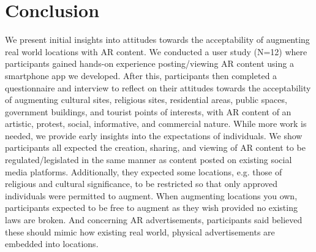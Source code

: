 \section{Conclusion}
We present initial insights into attitudes towards the acceptability of augmenting real world locations with AR content. 
We conducted a user study (N=12) where participants gained hands-on experience posting/viewing AR content using a smartphone app we developed. 
After this, participants then completed a questionnaire and interview to reflect on their attitudes towards the acceptability of augmenting cultural sites, religious sites, residential areas, public spaces, government buildings, and tourist points of interests, with AR content of an artistic, protest, social, informative, and commercial nature. 
While more work is needed, we provide early insights into the expectations of individuals. 
We show participants all expected the creation, sharing, and viewing of AR content to be regulated/legislated in the same manner as content posted on existing social media platforms. 
Additionally, they expected some locations, e.g. those of religious and cultural significance, to be restricted so that only approved individuals were permitted to augment. 
When augmenting locations you own, participants expected to be free to augment as they wish provided no existing laws are broken. 
And concerning AR advertisements, participants said believed these should mimic how existing real world, physical advertisements are embedded into locations. 
